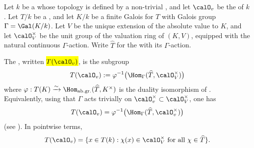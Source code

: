 \begin{definition} \label{definition:maximal_compact_subgroup_of_torus_over_locally_compact_field}
    Let $k$ be a  whose topology is defined by a non-trivial , and let $\calO_v$ be the  of $k$. Let $T/k$ be a , and let $K/k$ be a finite Galois  for $T$ with Galois group $\Gamma = \Gal(K/k)$. Let $V$ be the unique extension of the absolute value to $K$, and let $\calO_V^\times$ be the unit group of the valuation ring of $(K,V)$, equipped with the natural continuous $\Gamma$-action. Write $\widehat{T}$ for the  with its $\Gamma$-action.

    The , written \hl{$T(\calO_v)$}, is the subgroup
    $$T(\calO_v) := \varphi^{-1}\bigl(\Hom_\Gamma(\widehat{T}, \calO_V^\times)\bigr)$$
    where $\varphi: T(K) \xrightarrow{\sim} \Hom_{\mathrm{ab. gr.}}(\widehat{T}, K^\times)$ is the duality isomorphism of . Equivalently, using that $\Gamma$ acts trivially on $\calO_v^\times \subset \calO_V^\times$, one has
    $$T(\calO_v) = \varphi^{-1}\bigl(\Hom_\Gamma(\widehat{T}, \calO_v^\times)\bigr)$$
    (see ). In pointwise terms,
    $$T(\calO_v) = \{x \in T(k) : \chi(x) \in \calO_V^\times \text{ for all } \chi \in \widehat{T}\}.$$
\end{definition}